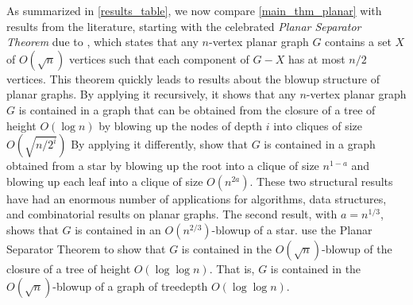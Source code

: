 \documentclass{patmorin}
\newcommand{\david}[1]{{\color{orange} David: #1}}
\newcommand{\pat}[1]{\textcolor{Blue}{Pat: #1}}
\newcommand{\defin}[1]{\emph{\textcolor{brightmaroon}{#1}}}
\begin{document}
As summarized in \cref{results_table}, we now compare \cref{main_thm_planar} with results from the literature, starting with the celebrated \defin{Planar Separator Theorem} due to \citet{lipton.tarjan:separator}, which states that any $n$-vertex planar graph $G$ contains a set $X$ of $O(\sqrt{n})$ vertices such that each component of $G-X$ has at most $n/2$ vertices. This theorem quickly leads to results about the blowup structure of planar graphs.  By applying it recursively, it shows that any $n$-vertex planar graph $G$ is contained in a graph that can be obtained from the closure of a %
tree of height $O(\log n)$ by blowing up the nodes of depth $i$ into cliques of size $O(\sqrt{n/2^i})$
By applying it differently, \citet{lipton.tarjan:applications} show that $G$ is contained in a graph obtained from a star by blowing up the root into a clique of size $n^{1-a}$ and blowing up each leaf into a clique of size $O(n^{2a})$. These two structural results have had an enormous number of applications for algorithms, data structures, and combinatorial results on planar graphs. The second result, with $a=n^{1/3}$, shows that $G$ is contained in an $O(n^{2/3})$-blowup of a star. \citet{DvoWoo} use the Planar Separator Theorem to show that $G$ is contained in the $O(\sqrt{n})$-blowup of the closure of a tree %
of height $O(\log\log n)$. That is, $G$ is contained in the $O(\sqrt{n})$-blowup of a graph of treedepth $O(\log\log n)$.
\end{document}
